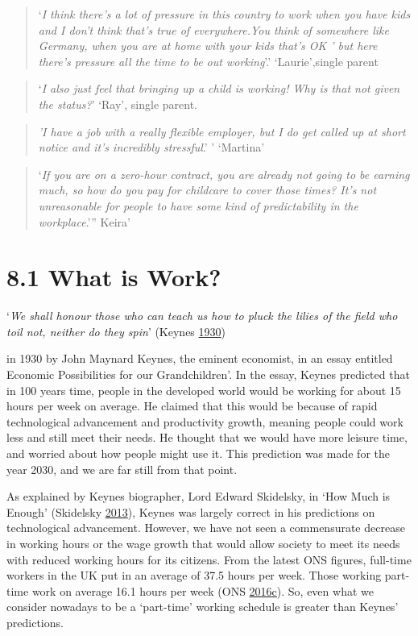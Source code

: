 \documentclass[]{tufte-handout}
\begin{document}
\begin{quote}
`\emph{I think there's a lot of pressure in this country to work when
you have kids and I don't think that's true of everywhere.You think of
somewhere like Germany, when you are at home with your kids that's OK '
but here there's pressure all the time to be out working}'.'
`Laurie',single parent
\end{quote}

\begin{quote}
`\emph{I also just feel that bringing up a child is working! Why is that
not given the status?}' `Ray', single parent.
\end{quote}

\begin{quote}
\emph{'I have a job with a really flexible employer, but I do get called
up at short notice and it's incredibly stressful}.' ' `Martina'
\end{quote}

\begin{quote}
`\emph{If you are on a zero-hour contract, you are already not going to
be earning much, so how do you pay for childcare to cover those times?
It's not unreasonable for people to have some kind of predictability in
the workplace}.''' Keira'
\end{quote}

\hypertarget{what-is-work}{%
\section{8.1 What is Work?}\label{what-is-work}}

`\emph{We shall honour those who can teach us how to pluck the lilies of
the field who toil not, neither do they spin}' (Keynes
\protect\hyperlink{ref-Keynes1930}{1930})

in 1930 by John Maynard Keynes, the
eminent economist, in an essay entitled Economic Possibilities for our
Grandchildren'. In the essay, Keynes predicted that in 100 years time,
people in the developed world would be working for about 15 hours per
week on average. He claimed that this would be because of rapid
technological advancement and productivity growth, meaning people could
work less and still meet their needs. He thought that we would have more
leisure time, and worried about how people might use it. This prediction
was made for the year 2030, and we are far still from that point.

As explained by Keynes biographer, Lord Edward Skidelsky, in `How Much
is Enough' (Skidelsky \protect\hyperlink{ref-Skidelsky2013}{2013}),
Keynes was largely correct in his predictions on technological
advancement. However, we have not seen a commensurate decrease in
working hours or the wage growth that would allow society to meet its
needs with reduced working hours for its citizens. From the latest ONS
figures, full-time workers in the UK put in an average of 37.5 hours per
week. Those working part-time work on average 16.1 hours per week (ONS
\protect\hyperlink{ref-ONS2016b}{2016}\protect\hyperlink{ref-ONS2016b}{c}).
So, even what we consider nowadays to be a `part-time' working schedule
is greater than Keynes' predictions.
\end{document}
